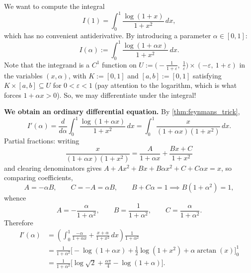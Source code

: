 \begin{example}
\label{ex:feynman_log_integral}
We want to compute the integral
\[I(1) = \int_0^1 \frac{\log(1+x)}{1+x^2}\,dx,\]
which has no convenient antiderivative. By introducing a parameter $\alpha \in [0,1]$:
\[I(\alpha) := \int_0^1 \frac{\log(1+\alpha x)}{1+x^2}\,dx.\]
Note that the integrand is a $C^1$ function on
$U := \big(-\tfrac{1}{1+\varepsilon},\ \tfrac1\varepsilon\big) \times (-\varepsilon,\ 1+\varepsilon)$
in the variables $(x,\alpha)$, with $K := [0,1]$ and $[a,b] := [0,1]$ satisfying
$K\times[a,b] \subseteq U$ for $0 < \varepsilon < 1$ (pay attention to the logarithm, which is
what forces $1+\alpha x > 0$). So, we may differentiate under the integral!

\textbf{We obtain an ordinary differential equation.} By \cref{thm:feynmans_trick},
\[I'(\alpha) = \frac{d}{d\alpha}\int_0^1 \frac{\log(1+\alpha x)}{1+x^2}\,dx
  = \int_0^1 \frac{x}{(1+\alpha x)(1+x^2)}\,dx.\]
Partial fractions: writing
\[\frac{x}{(1+\alpha x)(1+x^2)} = \frac{A}{1+\alpha x} + \frac{Bx+C}{1+x^2}\]
and clearing denominators gives $A + Ax^2 + Bx + B\alpha x^2 + C + C\alpha x = x$, so comparing
coefficients,
\[A = -\alpha B, \qquad C = -A = \alpha B, \qquad B + C\alpha = 1
  \implies B(1+\alpha^2) = 1,\]
whence
\[A = -\frac{\alpha}{1+\alpha^2}, \qquad B = \frac{1}{1+\alpha^2}, \qquad C = \frac{\alpha}{1+\alpha^2}.\]
Therefore
\[
\begin{aligned}
I'(\alpha) &= \left(\int_0^1 \frac{-\alpha}{1+\alpha x} + \frac{x+\alpha}{1+x^2}\,dx\right)\frac{1}{1+\alpha^2} \\
&= \frac{1}{1+\alpha^2}\Big[-\log(1+\alpha x) + \tfrac12\log(1+x^2) + \alpha\arctan(x)\Big]_0^1 \\
&= \frac{1}{1+\alpha^2}\Big[\log\sqrt2 + \tfrac{\alpha\pi}{4} - \log(1+\alpha)\Big].
\end{aligned}
\]


\end{example}
